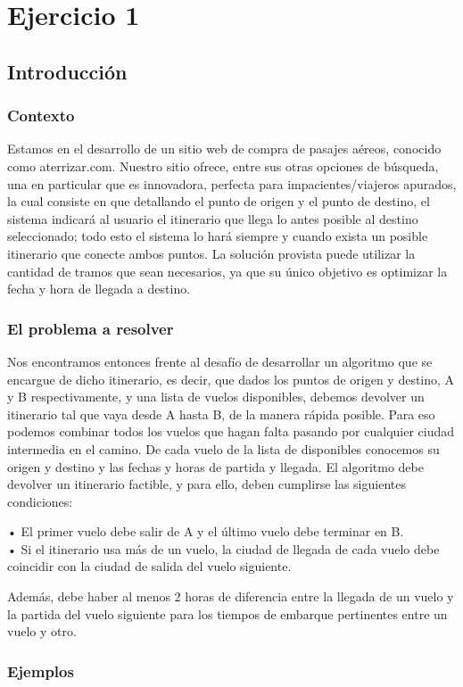 \documentclass[10pt,a4paper]{article}
\begin{document}
\section{Ejercicio 1}
\subsection{Introducción}
\indent \subsubsection{Contexto}
Estamos en el desarrollo de un sitio web de compra de pasajes aéreos, conocido como aterrizar.com. Nuestro sitio ofrece, entre sus otras opciones de búsqueda, una en particular que es innovadora, perfecta para impacientes/viajeros apurados, la cual consiste en que detallando el punto de origen y el punto de destino, el sistema indicará al usuario el itinerario que llega lo antes posible al destino seleccionado; todo esto el sistema lo hará siempre y cuando exista un posible itinerario que conecte ambos puntos.
La solución provista puede utilizar la cantidad de tramos que sean necesarios, ya que su único objetivo es optimizar la fecha y hora de llegada a destino.
\indent \subsubsection{El problema a resolver}

Nos encontramos entonces frente al desafío de desarrollar un algoritmo que se encargue de dicho itinerario, es decir, que dados los puntos de origen y destino, A y B respectivamente, y una lista de vuelos disponibles, debemos devolver un itinerario tal que vaya desde A hasta B, de la manera rápida posible. Para eso podemos combinar todos los vuelos que hagan falta pasando por cualquier ciudad intermedia en el camino.
De cada vuelo de la lista de disponibles conocemos su origen y destino y las fechas y horas de partida y llegada.
El algoritmo debe devolver un itinerario factible, y para ello, deben cumplirse las siguientes condiciones:

\indent• El primer vuelo debe salir de A y el último vuelo debe terminar en B.\\
\indent• Si el itinerario usa más de un vuelo, la ciudad de llegada de cada vuelo debe coincidir con la ciudad de salida del vuelo siguiente.

Además, debe haber al menos 2 horas de diferencia entre la llegada de un vuelo y la partida del vuelo siguiente para los tiempos de embarque pertinentes entre un vuelo y otro.
\indent \subsubsection{Ejemplos}
\end{document}
